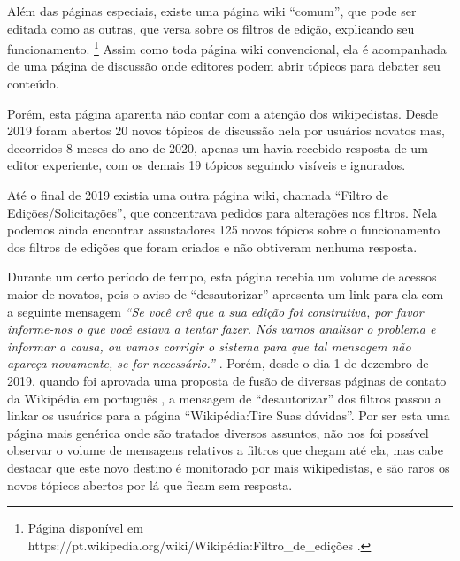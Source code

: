 Além das páginas especiais, existe uma página wiki ``comum'', que pode ser editada como as outras, que versa sobre os filtros de edição, explicando seu funcionamento. \footnote{Página disponível em https://pt.wikipedia.org/wiki/Wikipédia:Filtro\_de\_edições .} Assim como toda página wiki convencional, ela é acompanhada de uma página de discussão onde editores podem abrir tópicos para debater seu conteúdo.

Porém, esta página aparenta não contar com a atenção dos wikipedistas. Desde 2019 foram abertos 20 novos tópicos de discussão nela por usuários novatos mas, decorridos 8 meses do ano de 2020, apenas um havia recebido resposta de um editor experiente, com os demais 19 tópicos seguindo visíveis e ignorados. 

Até o final de 2019 existia uma outra página wiki, chamada ``Filtro de Edições/Solicitações'', que concentrava pedidos para alterações nos filtros. Nela podemos ainda encontrar assustadores 125 novos tópicos sobre o funcionamento dos filtros de edições que foram criados e não obtiveram nenhuma resposta. 

Durante um certo período de tempo, esta página recebia um volume de acessos maior de novatos, pois o aviso de ``desautorizar'' apresenta um link para ela com a seguinte mensagem \textit{``Se você crê que a sua edição foi construtiva, por favor informe-nos o que você estava a tentar fazer. Nós vamos analisar o problema e informar a causa, ou vamos corrigir o sistema para que tal mensagem não apareça novamente, se for necessário.''} . Porém, desde o dia 1 de dezembro de 2019, quando foi aprovada uma proposta de fusão de diversas páginas de contato da Wikipédia em português , a mensagem de ``desautorizar'' dos filtros passou a linkar os usuários para a página ``Wikipédia:Tire Suas dúvidas''. Por ser esta uma página mais genérica onde são tratados diversos assuntos, não nos foi possível observar o volume de mensagens relativos a filtros que chegam até ela, mas cabe destacar que este novo destino é monitorado por mais wikipedistas, e são raros os novos tópicos abertos por lá que ficam sem resposta.


